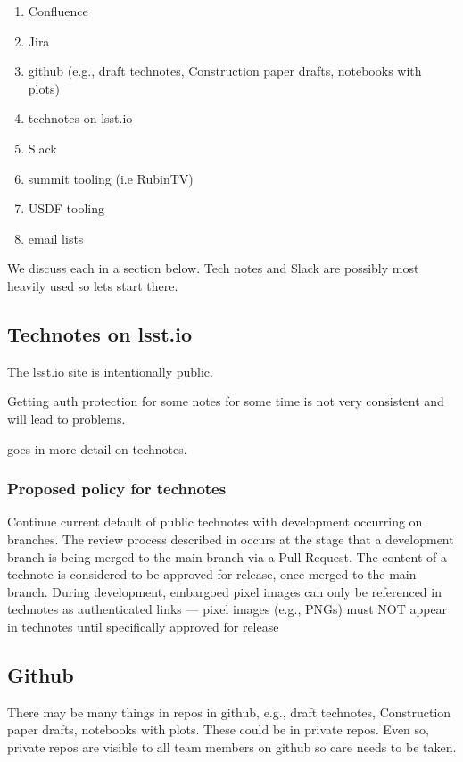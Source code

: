 \begin{enumerate}
    \item Confluence
    \item Jira
    \item github (e.g., draft technotes, Construction paper drafts, notebooks with plots)
    \item technotes on lsst.io
    \item Slack
    \item summit tooling (i.e RubinTV)
    \item USDF tooling
    \item email lists
\end{enumerate}

We discuss each in a section below.
Tech notes and Slack are possibly most heavily used so lets start there.



\subsection{Technotes on lsst.io}
The lsst.io site is intentionally public.

Getting auth protection for some notes for some time is not very consistent and will lead to problems.

 goes in more detail on technotes.

\subsubsection{Proposed policy for technotes}
Continue current default of public technotes with development occurring on branches. The review process described in  occurs at the stage that a development branch is being merged to the main branch via a Pull Request. The content of a technote is considered to be approved for release, once merged to the main branch.
During development, embargoed pixel images can only be referenced in technotes as authenticated links --- pixel images (e.g., PNGs) must NOT appear in technotes until specifically approved for release

\subsection{Github}
There may be many things in repos in github, e.g., draft technotes, Construction paper drafts, notebooks with plots.
These could be in private repos.
Even so, private repos are visible to all team members on github so care needs to be taken.

